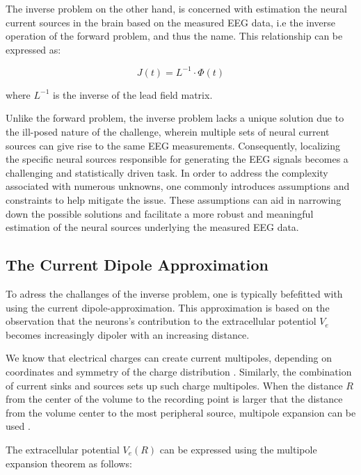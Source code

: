 \documentclass[a4paper, UKenglish, 11pt]{uiomaster}
\begin{document}
The inverse problem on the other hand, is concerned with estimation the neural current sources in the brain based on the measured EEG data, i.e the inverse operation of the forward problem, and thus the name. This relationship can be expressed as:

\begin{equation}
J(t) = L^{-1} \cdot \Phi(t)
\label{eq:forward_problem}
\end{equation}

where $L^{-1}$ is the inverse of the lead field matrix.

Unlike the forward problem, the inverse problem lacks a unique solution due to the ill-posed nature of the challenge, wherein multiple sets of neural current sources can give rise to the same EEG measurements. Consequently, localizing the specific neural sources responsible for generating the EEG signals becomes a challenging and statistically driven task. In order to address the complexity associated with numerous unknowns, one commonly introduces assumptions and constraints to help mitigate the issue. These assumptions can aid in narrowing down the possible solutions and facilitate a more robust and meaningful estimation of the neural sources underlying the measured EEG data.

\subsection{The Current Dipole Approximation}

To adress the challanges of the inverse problem, one is typically befefitted with using the current dipole-approximation. This approximation is based on the observation that the neurons's contribution to the extracellular potentiol $V_e$ becomes increasingly dipoler with an increasing distance.

We know that electrical charges can create current multipoles, depending on coordinates and symmetry of the charge distribution \cite{wiki:multipoles}. Similarly, the combination of current sinks and sources sets up such charge multipoles. When the distance $R$ from the center of the volume to the recording point is larger that the distance from the volume center to the most peripheral source, multipole expansion can be used \cite{jackson1999classical}.

The extracellular potential $V_e(R)$ can be expressed using the multipole expansion theorem as follows:
\end{document}
